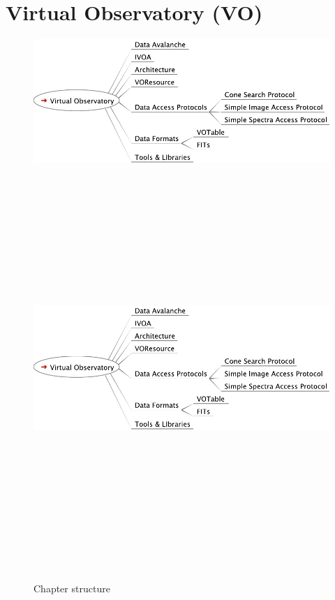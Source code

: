 

\ifpdf
    \graphicspath{{pic/}}
\else
    \graphicspath{{pic/}}
\fi

\chapter{ Virtual Observatory (VO)}


\begin{figure}[!htbp]
  \begin{center}
    \leavevmode
    \ifpdf
    \includegraphics[scale = 1]{mapVirtualObservatory}
    \else
    \includegraphics[bb = 92 86 545 742, height=6in]{mapVirtualObservatory}
    \fi
    \caption{Chapter structure}
    \label{FigStructure}
  \end{center}
\end{figure}

